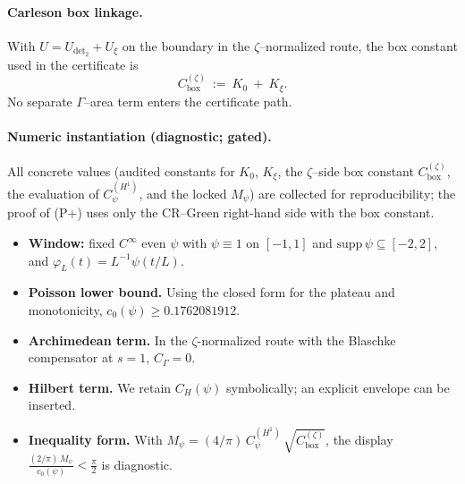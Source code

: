 \documentclass[11pt]{article}
\theoremstyle{definition}
\theoremstyle{remark}
\theoremstyle{definition}
\begin{document}
\paragraph{Carleson box linkage.}
With $U=U_{\det_2}+U_{\xi}$ on the boundary in the $\zeta$–normalized route, the box constant used in the certificate is
\[
  C_{\mathrm{box}}^{(\zeta)}\ :=\ K_0\ +\ K_\xi.
\]
No separate $\Gamma$–area term enters the certificate path.

\paragraph{Numeric instantiation (diagnostic; gated).}
All concrete values (audited constants for $K_0$, $K_\xi$, the $\zeta$–side box constant $C_{\mathrm{box}}^{(\zeta)}$, the evaluation of $C_\psi^{(H^1)}$, and the locked $M_\psi$) are collected for reproducibility; the proof of (P+) uses only the CR–Green right-hand side with the box constant.
\begin{itemize}
  \item \textbf{Window:} fixed $C^\infty$ even $\psi$ with $\psi\equiv 1$ on $[-1,1]$ and $\mathrm{supp}\,\psi\subseteq[-2,2]$, and $\varphi_L(t)=L^{-1}\psi(t/L)$.
  \item \textbf{Poisson lower bound.} Using the closed form for the plateau and monotonicity, $c_0(\psi)\ge 0.1762081912$.
  \item \textbf{Archimedean term.} In the $\zeta$-normalized route with the Blaschke compensator at $s=1$, $C_\Gamma=0$.
  \item \textbf{Hilbert term.} We retain $C_H(\psi)$ symbolically; an explicit envelope can be inserted.
  \item \textbf{Inequality form.} With $M_\psi= (4/\pi)\,C_\psi^{(H^1)}\,\sqrt{C_{\mathrm{box}}^{(\zeta)}}$, the display $\frac{(2/\pi)\,M_\psi}{c_0(\psi)}<\frac{\pi}{2}$ is diagnostic.
\end{itemize}
 
\end{document}
